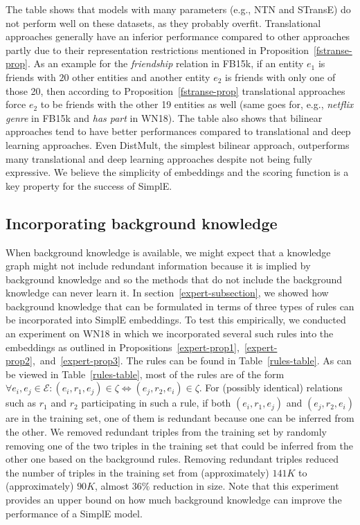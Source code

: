 \documentclass{article}
\newcommand{\entities}{\ensuremath{\mathcal{E}}}
\newcommand{\triple}[3]{(\mathit{#1}, \mathit{#2}, \mathit{#3})}
\begin{document}
The table shows that models with many parameters (e.g., NTN and STransE) do not perform well on these datasets, as they probably overfit. Translational approaches generally have an inferior performance compared to other approaches partly due to their representation restrictions mentioned in Proposition~\ref{fstranse-prop}. As an example for the \emph{friendship} relation in FB15k, if an entity $e_1$ is friends with $20$ other entities and another entity $e_2$ is friends with only one of those 20, then according to Proposition~\ref{fstranse-prop} translational approaches force $e_2$ to be friends with the other 19 entities as well (same goes for, e.g., \emph{netflix genre} in FB15k and \emph{has part} in WN18). The table also shows that bilinear approaches tend to have better performances compared to translational and deep learning approaches. Even DistMult, the simplest bilinear approach, outperforms many translational and deep learning approaches despite not being fully expressive. We believe the simplicity of embeddings and the scoring function is a key property for the success of SimplE.

\subsection{Incorporating background knowledge} \label{expert-knowledge-experiment-section}
When background knowledge is available, we might expect that a knowledge graph might not include redundant information because it is implied by background knowledge and so the methods that do not include the background knowledge can never learn it.
In section~\ref{expert-subsection}, we showed how background knowledge that can be formulated in terms of three types of rules can be incorporated into SimplE embeddings. 
To test this empirically, we conducted an experiment on WN18 in which we incorporated several such rules into the embeddings as outlined in Propositions~\ref{expert-prop1},~\ref{expert-prop2},~and~\ref{expert-prop3}. The rules can be found in Table~\ref{rules-table}. 
As can be viewed in Table~\ref{rules-table}, most of the rules are of the form $\forall e_i, e_j \in \entities: \triple{e_i}{r_1}{e_j} \in \zeta \Leftrightarrow \triple{e_j}{r_2}{e_i} \in \zeta$. For (possibly identical) relations such as $r_1$ and $r_2$ participating in such a rule, if both $\triple{e_i}{r_1}{e_j}$ and $\triple{e_j}{r_2}{e_i}$ are in the training set, one of them is redundant because one can be inferred from the other.
We removed redundant triples from the training set by randomly removing one of the two triples in the training set that could be inferred from the other one based on the background rules. Removing redundant triples reduced the number of triples in the training set from (approximately) $141K$ to (approximately) $90K$, almost $36\%$ reduction in size. Note that this experiment provides an upper bound on how much background knowledge can improve the performance of a SimplE model.
\end{document}
